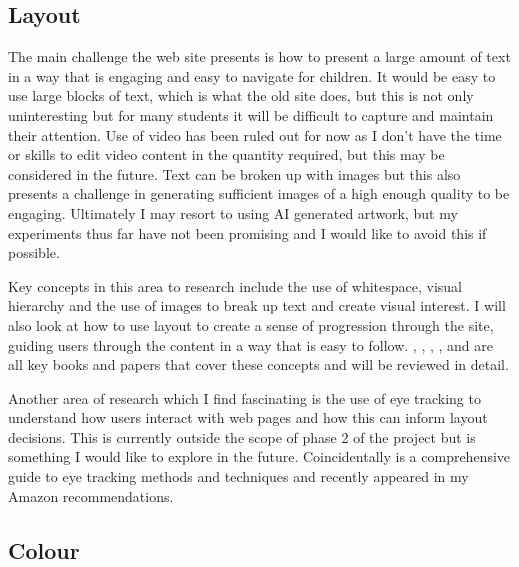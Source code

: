 \documentclass[a4paper, 12pt]{article}
\begin{document}
\subsection{Layout}
The main challenge the web site presents is how to present a large amount of text in a way that is engaging and easy to navigate for children. It would be easy to use large blocks of text, which is what the old site does, but this is not only uninteresting but for many students it will be difficult to capture and maintain their attention. Use of video has been ruled out for now as I don't have the time or skills to edit video content in the quantity required, but this may be considered in the future. Text can be broken up with images but this also presents a challenge in generating sufficient images of a high enough quality to be engaging. Ultimately I may resort to using AI generated artwork, but my experiments thus far have not been promising and I would like to avoid this if possible.

Key concepts in this area to research include the use of whitespace, visual hierarchy and the use of images to break up text and create visual interest. I will also look at how to use layout to create a sense of progression through the site, guiding users through the content in a way that is easy to follow. \cite{lupton2008}, \cite{mullet1995}, \cite{roth2013}, \cite{michailidou2008}, and \cite{williams2015} are all key books and papers that cover these concepts and will be reviewed in detail.

Another area of research which I find fascinating is the use of eye tracking to understand how users interact with web pages and how this can inform layout decisions. This is currently outside the scope of phase 2 of the project but is something I would like to explore in the future. Coincidentally \cite{holmquist2017} is a comprehensive guide to eye tracking methods and techniques and recently appeared in my Amazon recommendations.

\subsection{Colour}
\end{document}
